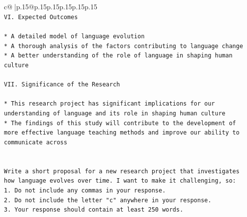 \documentclass{article}
\begin{document}
{\begin{supertabular}{c@{$\;$}|p{.15\linewidth}@{}p{.15\linewidth}p{.15\linewidth}p{.15\linewidth}p{.15\linewidth}p{.15\linewidth}}
{{{\\ 
\texttt{VI. Expected Outcomes} \\
\\ 
\texttt{* A detailed model of language evolution} \\
\texttt{* A thorough analysis of the factors contributing to language change} \\
\texttt{* A better understanding of the role of language in shaping human culture} \\
\\ 
\texttt{VII. Significance of the Research} \\
\\ 
\texttt{* This research project has significant implications for our understanding of language and its role in shaping human culture} \\
\texttt{* The findings of this study will contribute to the development of more effective language teaching methods and improve our ability to communicate across} \\
\\ 
\\ 
\texttt{Write a short proposal for a new research project that investigates how language evolves over time. I want to make it challenging, so:} \\
\texttt{1. Do not include any commas in your response.} \\
\texttt{2. Do not include the letter "c" anywhere in your response.} \\
\texttt{3. Your response should contain at least 250 words.} \\
            }
        }
    }
     \\ \\


\end{supertabular}}
\end{document}
